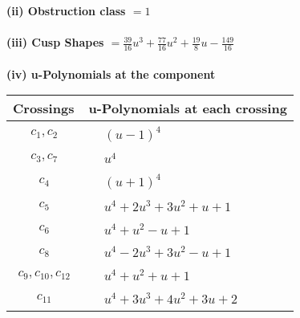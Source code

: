 \documentclass[1p]{elsarticle_modified}
\theoremstyle{definition}
\begin{document}
\flushleft \textbf{(ii) Obstruction class $= 1$}\\~\\
\flushleft \textbf{(iii) Cusp Shapes $= \frac{39}{16} u^3+\frac{77}{16} u^2+\frac{19}{8} u-\frac{149}{16}$}\\~\\
\newpage\renewcommand{\arraystretch}{1}
\flushleft \textbf{(iv) u-Polynomials at the component}\newline \\
\begin{tabular}{m{50pt}|m{274pt}}
Crossings & \hspace{64pt}u-Polynomials at each crossing \\
\hline $$\begin{aligned}c_{1},c_{2}\end{aligned}$$&$\begin{aligned}
&(u-1)^4
\end{aligned}$\\
\hline $$\begin{aligned}c_{3},c_{7}\end{aligned}$$&$\begin{aligned}
&u^4
\end{aligned}$\\
\hline $$\begin{aligned}c_{4}\end{aligned}$$&$\begin{aligned}
&(u+1)^4
\end{aligned}$\\
\hline $$\begin{aligned}c_{5}\end{aligned}$$&$\begin{aligned}
&u^4+2 u^3+3 u^2+u+1
\end{aligned}$\\
\hline $$\begin{aligned}c_{6}\end{aligned}$$&$\begin{aligned}
&u^4+u^2- u+1
\end{aligned}$\\
\hline $$\begin{aligned}c_{8}\end{aligned}$$&$\begin{aligned}
&u^4-2 u^3+3 u^2- u+1
\end{aligned}$\\
\hline $$\begin{aligned}c_{9},c_{10},c_{12}\end{aligned}$$&$\begin{aligned}
&u^4+u^2+u+1
\end{aligned}$\\
\hline $$\begin{aligned}c_{11}\end{aligned}$$&$\begin{aligned}
&u^4+3 u^3+4 u^2+3 u+2
\end{aligned}$\\
\hline
\end{tabular}\\~\\
\end{document}
